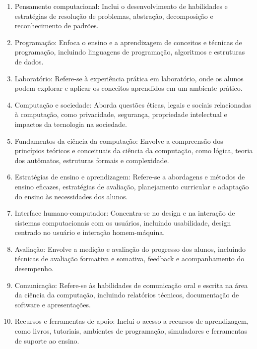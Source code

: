 \begin{enumerate}
    \item Pensamento computacional: Inclui o desenvolvimento de habilidades e estratégias de resolução de problemas, abstração, decomposição e reconhecimento de padrões.
    \item Programação: Enfoca o ensino e a aprendizagem de conceitos e técnicas de programação, incluindo linguagens de programação, algoritmos e estruturas de dados.
    \item Laboratório: Refere-se à experiência prática em laboratório, onde os alunos podem explorar e aplicar os conceitos aprendidos em um ambiente prático.
    \item Computação e sociedade: Aborda questões éticas, legais e sociais relacionadas à computação, como privacidade, segurança, propriedade intelectual e impactos da tecnologia na sociedade.
    \item Fundamentos da ciência da computação: Envolve a compreensão dos princípios teóricos e conceituais da ciência da computação, como lógica, teoria dos autômatos, estruturas formais e complexidade.
    \item Estratégias de ensino e aprendizagem: Refere-se a abordagens e métodos de ensino eficazes, estratégias de avaliação, planejamento curricular e adaptação do ensino às necessidades dos alunos.
    \item Interface humano-computador: Concentra-se no design e na interação de sistemas computacionais com os usuários, incluindo usabilidade, design centrado no usuário e interação homem-máquina.
    \item Avaliação: Envolve a medição e avaliação do progresso dos alunos, incluindo técnicas de avaliação formativa e somativa, feedback e acompanhamento do desempenho.
    \item Comunicação: Refere-se às habilidades de comunicação oral e escrita na área da ciência da computação, incluindo relatórios técnicos, documentação de software e apresentações.
    \item Recursos e ferramentas de apoio: Inclui o acesso a recursos de aprendizagem, como livros, tutoriais, ambientes de programação, simuladores e ferramentas de suporte ao ensino.
\end{enumerate}




